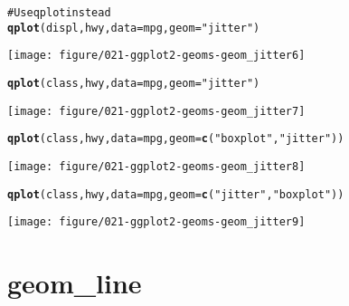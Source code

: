 \documentclass[a4paper,titlepage]{tufte-handout}\usepackage{graphicx, color}
\makeatletter
\def\maxwidth{ %
  \ifdim\Gin@nat@width>\linewidth
    \linewidth
  \else
    \Gin@nat@width
  \fi
}
\newcommand{\hlfunctioncall}[1]{\textcolor[rgb]{0.501960784313725,0,0.329411764705882}{\textbf{#1}}}%
\newcommand{\hlstring}[1]{\textcolor[rgb]{0.6,0.6,1}{#1}}%
\newcommand{\hlcomment}[1]{\textcolor[rgb]{0.180392156862745,0.6,0.341176470588235}{#1}}%
\newenvironment{kframe}{%
 \def\at@end@of@kframe{}%
 \ifinner\ifhmode%
  \def\at@end@of@kframe{\end{minipage}}%
  \begin{minipage}{\columnwidth}%
 \fi\fi%
 \def\FrameCommand##1{\hskip\@totalleftmargin \hskip-\fboxsep
 \colorbox{shadecolor}{##1}\hskip-\fboxsep
     \hskip-\linewidth \hskip-\@totalleftmargin \hskip\columnwidth}%
 \MakeFramed {\advance\hsize-\width
   \@totalleftmargin\z@ \linewidth\hsize
   \@setminipage}}%
 {\par\unskip\endMakeFramed%
 \at@end@of@kframe}
\newenvironment{knitrout}{}{} %
\makeatother
\begin{document}
\begin{knitrout}
\begin{kframe}
\begin{alltt}
\hlcomment{# Use qplot instead}
\hlfunctioncall{qplot}(displ, hwy, data = mpg, geom = \hlstring{"jitter"})
\end{alltt}
\end{kframe}
\texttt{[image: figure/021-ggplot2-geoms-geom\_jitter6]} 
\begin{kframe}\begin{alltt}
\hlfunctioncall{qplot}(class, hwy, data = mpg, geom = \hlstring{"jitter"})
\end{alltt}
\end{kframe}
\texttt{[image: figure/021-ggplot2-geoms-geom\_jitter7]} 
\begin{kframe}\begin{alltt}
\hlfunctioncall{qplot}(class, hwy, data = mpg, geom = \hlfunctioncall{c}(\hlstring{"boxplot"}, \hlstring{"jitter"}))
\end{alltt}
\end{kframe}
\texttt{[image: figure/021-ggplot2-geoms-geom\_jitter8]} 
\begin{kframe}\begin{alltt}
\hlfunctioncall{qplot}(class, hwy, data = mpg, geom = \hlfunctioncall{c}(\hlstring{"jitter"}, \hlstring{"boxplot"}))
\end{alltt}
\end{kframe}
\texttt{[image: figure/021-ggplot2-geoms-geom\_jitter9]} 
\begin{kframe}\begin{alltt}


\end{alltt}
\end{kframe}
\end{knitrout}



\section{geom\_line}
\end{document}
